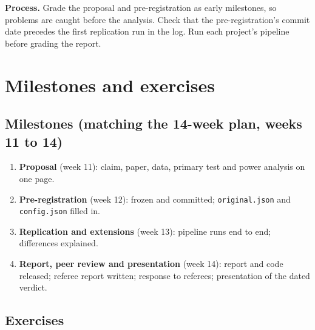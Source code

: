 \textbf{Process.} Grade the proposal and pre-registration as early milestones, so problems are caught before the analysis. Check that the pre-registration's commit date precedes the first replication run in the log. Run each project's pipeline before grading the report.

\section*{Milestones and exercises}

\subsection*{Milestones (matching the 14-week plan, weeks 11 to 14)}

\begin{enumerate}
  \item \textbf{Proposal} (week 11): claim, paper, data, primary test and power analysis on one page.
  \item \textbf{Pre-registration} (week 12): frozen and committed; \texttt{original.json} and \texttt{config.json} filled in.
  \item \textbf{Replication and extensions} (week 13): pipeline runs end to end; differences explained.
  \item \textbf{Report, peer review and presentation} (week 14): report and code released; referee report written; response to referees; presentation of the dated verdict.
\end{enumerate}

\subsection*{Exercises}

